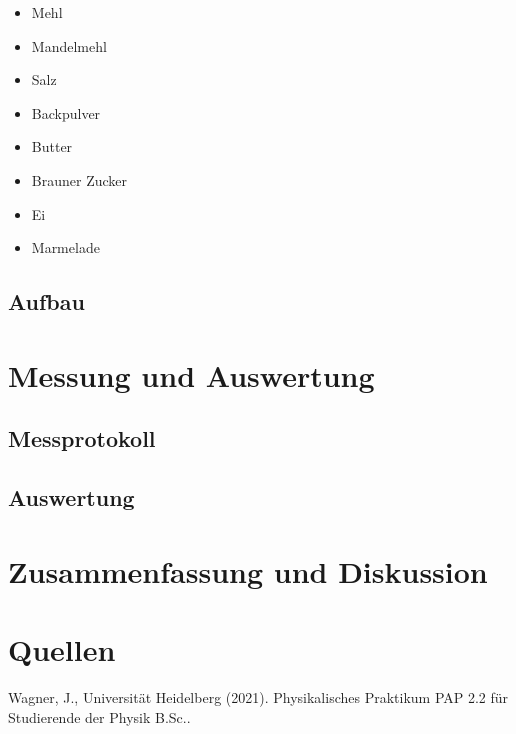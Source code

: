 \documentclass[a4paper,12pt]{article}
\newcounter{Versuch}
\begin{document}
    \begin{itemize}
        \item Mehl
        
        \item Mandelmehl
        
        \item Salz
        
        \item Backpulver
        
        \item Butter
        
        \item Brauner Zucker
        
        \item Ei
        
        \item Marmelade
    \end{itemize}
    
    \subsection{Aufbau}
    
\newpage    
    
\section{Messung und Auswertung}

    \subsection{Messprotokoll}
    
    \subsection{Auswertung}
    
\section{Zusammenfassung und Diskussion}

\section{Quellen}

Wagner, J., Universität Heidelberg (2021). Physikalisches Praktikum PAP 2.2 für Studierende der Physik B.Sc.. 



\end{document}

